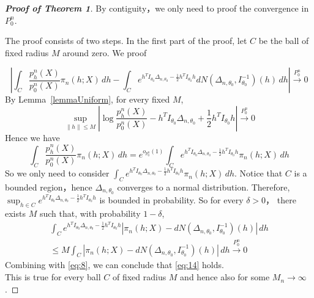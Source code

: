 




\begin{proof}[\textbf{Proof of Theorem 1}]
    By contiguity，we only need to proof the convergence in $P_0^n$.

The proof consists of two steps. In the first part of the proof, let $C$ be the ball of fixed radius $M$ around zero. We proof

\begin{equation}\label{eq:14}
    \left|\int_C \frac{p^n_h(X)}{p^n_0(X)}\pi_n (h;X) \, dh-\int_C e^{h^TI_{\theta_0}\Delta_{n,\theta_0}-\frac{1}{2}h^TI_{\theta_0}h}dN(\Delta_{n,\theta_0},I_{\theta_0}^{-1})(h)\, dh\right|
 \xrightarrow{P^n_0}0
\end{equation}
By Lemma~\ref{lemmaUniform}, for every fixed $M$,
\begin{equation}
    \sup_{\|h\|\leq M}|\log \frac{p_h^n(X)}{p_0^n(X)}-h^TI_{\theta_0}\Delta_{n,\theta_0}+\frac{1}{2}h^TI_{\theta_0}h|\xrightarrow{P_0^n}0 
\end{equation}
Hence we have
\begin{equation}\label{eq:8}
    \int_C \frac{p_h^n(X)}{p_0^n(X)}\pi_n (h;X) \, dh=e^{o_{p^n_0}(1)}\int_C e^{h^TI_{\theta_0}\Delta_{n,\theta_0}-\frac{1}{2}h^TI_{\theta_0}h}\pi_n (h;X) \, dh
\end{equation}
So we only need to consider $\int_C e^{h^TI_{\theta_0}\Delta_{n,\theta_0}-\frac{1}{2}h^TI_{\theta_0}h}\pi_n (h;X) \, dh$. Notice that $C$ is a bounded region，hence $\Delta_{n,\theta_0}$ converges to a normal distribution. Therefore, $\sup_{h\in C}e^{h^TI_{\theta_0}\Delta_{n,\theta_0}-\frac{1}{2}h^TI_{\theta_0}h}$ is bounded in probability. So for every $\delta>0$， there exists $M$ such that, with probability $1-\delta$,
\begin{equation}
\begin{aligned}
    \int_C e^{h^TI_{\theta_0}\Delta_{n,\theta_0}-\frac{1}{2}h^TI_{\theta_0}h}|\pi_n (h;X)-dN(\Delta_{n,\theta_0},I_{\theta_0}^{-1})(h)|\, dh
\\
\leq M\int_C |\pi_n(h;X)-dN(\Delta_{n,\theta_0},I_{\theta_0}^{-1})(h)|\, dh\xrightarrow{P^n_0}0
\end{aligned}
\end{equation}
Combining with \eqref{eq:8}, we can conclude that \eqref{eq:14} holds. \\

This is true for every ball $C$ of fixed radius $M$ and hence also for some $M_n\to \infty$.


\end{proof}
